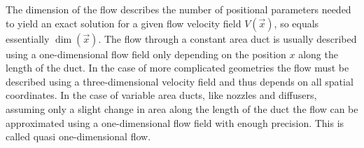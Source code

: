 	The dimension of the flow describes the number of positional parameters needed to yield an exact solution for a given flow velocity field $V(\vec{x})$, so equals essentially $\dim(\vec{x})$. 
	The flow through a constant area duct is usually described using a one-dimensional flow field only depending on the position $x$ along the length of the duct.
	In the case of more complicated geometries the flow must be described using a three-dimensional velocity field and thus depends on all spatial coordinates.
	In the case of variable area ducts, like nozzles and diffusers, assuming only a slight change in area along the length of the duct the flow can be approximated using a one-dimensional flow field with enough precision.
	This is called quasi one-dimensional flow. \cite{anderson2021modern}
